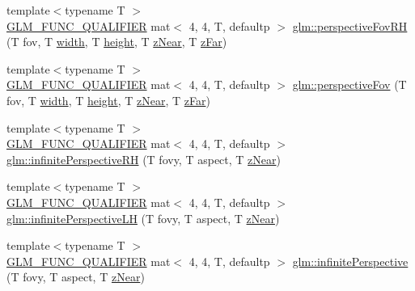 \begin{DoxyCompactItemize}
\item 
{\footnotesize template$<$typename T $>$ }\\\hyperlink{setup_8hpp_a33fdea6f91c5f834105f7415e2a64407}{G\+L\+M\+\_\+\+F\+U\+N\+C\+\_\+\+Q\+U\+A\+L\+I\+F\+I\+ER} mat$<$ 4, 4, T, defaultp $>$ \hyperlink{group__gtc__matrix__transform_gaf32bf563f28379c68554a44ee60c6a85}{glm\+::perspective\+Fov\+RH} (T fov, T \hyperlink{_s_d_l__opengl_8h_a9a82cf3caff84cabc4598e2619faac17}{width}, T \hyperlink{_s_d_l__opengl_8h_aa352f2804b9902ac30769c00dde75d5f}{height}, T \hyperlink{_s_d_l__opengl__glext_8h_a12d99226e590bbaaf0be69169eeb4834}{z\+Near}, T \hyperlink{_s_d_l__opengl__glext_8h_a1052a8235df129542aea6da80fbec6a1}{z\+Far})
\item 
{\footnotesize template$<$typename T $>$ }\\\hyperlink{setup_8hpp_a33fdea6f91c5f834105f7415e2a64407}{G\+L\+M\+\_\+\+F\+U\+N\+C\+\_\+\+Q\+U\+A\+L\+I\+F\+I\+ER} mat$<$ 4, 4, T, defaultp $>$ \hyperlink{group__gtc__matrix__transform_gaebd02240fd36e85ad754f02ddd9a560d}{glm\+::perspective\+Fov} (T fov, T \hyperlink{_s_d_l__opengl_8h_a9a82cf3caff84cabc4598e2619faac17}{width}, T \hyperlink{_s_d_l__opengl_8h_aa352f2804b9902ac30769c00dde75d5f}{height}, T \hyperlink{_s_d_l__opengl__glext_8h_a12d99226e590bbaaf0be69169eeb4834}{z\+Near}, T \hyperlink{_s_d_l__opengl__glext_8h_a1052a8235df129542aea6da80fbec6a1}{z\+Far})
\item 
{\footnotesize template$<$typename T $>$ }\\\hyperlink{setup_8hpp_a33fdea6f91c5f834105f7415e2a64407}{G\+L\+M\+\_\+\+F\+U\+N\+C\+\_\+\+Q\+U\+A\+L\+I\+F\+I\+ER} mat$<$ 4, 4, T, defaultp $>$ \hyperlink{group__gtc__matrix__transform_ga99672ffe5714ef478dab2437255fe7e1}{glm\+::infinite\+Perspective\+RH} (T fovy, T aspect, T \hyperlink{_s_d_l__opengl__glext_8h_a12d99226e590bbaaf0be69169eeb4834}{z\+Near})
\item 
{\footnotesize template$<$typename T $>$ }\\\hyperlink{setup_8hpp_a33fdea6f91c5f834105f7415e2a64407}{G\+L\+M\+\_\+\+F\+U\+N\+C\+\_\+\+Q\+U\+A\+L\+I\+F\+I\+ER} mat$<$ 4, 4, T, defaultp $>$ \hyperlink{group__gtc__matrix__transform_ga3201b30f5b3ea0f933246d87bfb992a9}{glm\+::infinite\+Perspective\+LH} (T fovy, T aspect, T \hyperlink{_s_d_l__opengl__glext_8h_a12d99226e590bbaaf0be69169eeb4834}{z\+Near})
\item 
{\footnotesize template$<$typename T $>$ }\\\hyperlink{setup_8hpp_a33fdea6f91c5f834105f7415e2a64407}{G\+L\+M\+\_\+\+F\+U\+N\+C\+\_\+\+Q\+U\+A\+L\+I\+F\+I\+ER} mat$<$ 4, 4, T, defaultp $>$ \hyperlink{group__gtc__matrix__transform_ga44fa38a18349450325cae2661bb115ca}{glm\+::infinite\+Perspective} (T fovy, T aspect, T \hyperlink{_s_d_l__opengl__glext_8h_a12d99226e590bbaaf0be69169eeb4834}{z\+Near})

\end{DoxyCompactItemize}
